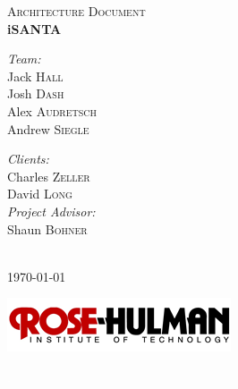\documentclass[11pt]{article}
\begin{document}
\begin{titlepage}
\begin{center}
\textsc{\Large Architecture Document}\\[0.5cm]
{ \Huge \bfseries iSANTA}\\[0.4cm]

\begin{minipage}{0.4\textwidth}
\begin{flushleft} \large
\emph{Team:}\\
Jack \textsc{Hall}\\
Josh \textsc{Dash}\\
Alex \textsc{Audretsch}\\
Andrew \textsc{Siegle}\\
\end{flushleft}
\end{minipage}
\begin{minipage}{0.4\textwidth}
\begin{flushright} \large
\emph{Clients:} \\
Charles \textsc{Zeller}\\
David \textsc{Long}\\
\emph{Project Advisor:}\\
Shaun \textsc{Bohner}
\end{flushright}
\end{minipage}
\\[1cm]
{\large \today}

\begin{center}
\includegraphics[scale = 4, angle = 0]{Rose-HulmanLogo.png}
\end{center}
\textcolor{white}{.}%
\\[3cm]

\end{center}

\end{titlepage}
\end{document}
